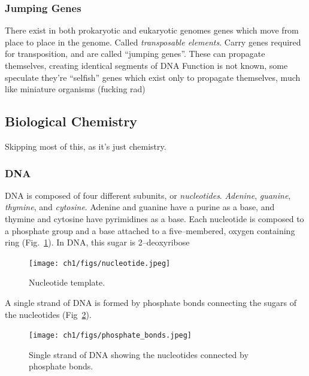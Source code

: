\documentclass[../waterman_intro_comp_bio.tex]{subfiles}
\begin{document}
        \subsubsection{Jumping Genes}
            \begin{outline}
                \1 There exist in both prokaryotic and eukaryotic genomes genes which move from place to place in the genome.
                    \2 Called \textit{transposable elements}.
                    \2 Carry genes required for transposition, and are called ``jumping genes''.
                \1 These can propagate themselves, creating identical segments of DNA
                \1 Function is not known, some speculate they're ``selfish'' genes which exist only to propagate themselves, much like miniature organisms (fucking rad)
            \end{outline}

        \subsection{Biological Chemistry}
            \begin{outline}
                \1 Skipping most of this, as it's just chemistry.
            \end{outline}

            \subsubsection{DNA}
                \begin{outline}
                    \1 DNA is composed of four different subunits, or \textit{nucleotides}.
                        \2 \textit{Adenine}, \textit{guanine}, \textit{thymine}, and \textit{cytosine}. Adenine and guanine have a purine as a base, and thymine and cytosine have pyrimidines as a base.
                        \2 Each nucleotide is composed to a phosphate group and a base attached to a five--membered, oxygen containing ring (Fig.~\ref{ch1:nucleotide}). In DNA, this sugar is 2--deoxyribose
                            \begin{figure}
                                \centering
                                \texttt{[image: ch1/figs/nucleotide.jpeg]}
                                \label{ch1:nucleotide}
                                \caption{Nucleotide template.}
                            \end{figure}

                    \1 A single strand of DNA is formed by phosphate bonds connecting the sugars of the nucleotides (Fig~\ref{ch1:phosphate}).
                        \begin{figure}
                            \centering
                            \texttt{[image: ch1/figs/phosphate\_bonds.jpeg]}
                            \label{ch1:phosphate}
                            \caption{Single strand of DNA showing the nucleotides connected by phosphate bonds.}
                        \end{figure}

                \end{outline}
\end{document}

